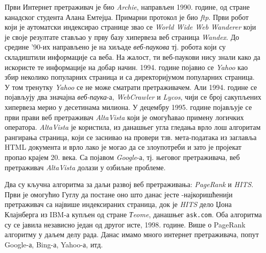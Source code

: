 Први Интернет претраживач је био \emph{Archie}, направљен 1990. године, од стране канадског студента Алана Емтејџа. Примарни протокол је био \emph{ftp}. Први робот који је аутоматски индексирао странице звао се \emph{World Wide Web Wanderer} који је своје резултате стављао у прву базу хипервеза веб страница \emph{Wandex}. До средине '90-их направљено је на хиљаде \emph{веб-паукова} тј. робота који су складиштили информације са веба. На жалост, ти веб-паукови нису знали како да искористе те информације на добар начин. 1994. године појавио се \emph{Yahoo} као збир неколико популарних страница и са директоријумом популарних страница. У том тренутку \emph{Yahoo} се не може сматрати претраживачем. Али 1994. године се појављују два значајна \emph{веб-паука}-а, \emph{WebCrawler} и \emph{Lycos}, чији се број сакупљених хипервеза мерио у десетинама милиона. У децембру 1995. године појављује се први прави веб претраживач \emph{AltaVista} који је омогућавао примену логичких оператора. \emph{AltaVista} је користила, из данашњег угла гледања врло лош алгоритам рангирања страница, који се заснивао на провери тзв. мета-података из заглавља HTML документа и врло лако је могао да се злоупотреби и зато је пројекат пропао крајем 20. века. Са појавом \emph{Google}-а, тј. његовог претраживача, веб претраживач \emph{AltaVista} долази у озбиљне проблеме.

Два су кључна алгоритма за даљи развој веб претраживања: \emph{PageRank} и \emph{HITS}. Први је омогућио Гуглу да постане оно што данас јесте -најкоришћенији претраживач са највише индексираних страница, док је \emph{HITS} дело Џона Клајнберга из IBM-а купљен од стране \emph{Тeome}, данашњег \texttt{ask.com}. Оба алгоритма су се јавила независно један од другог исте, 1998. године. Више о PageRank алгоритму у даљем делу рада. Данас имамо много интернет претраживача, попут Google-а, Bing-а, Yahoo-а, итд. \\
